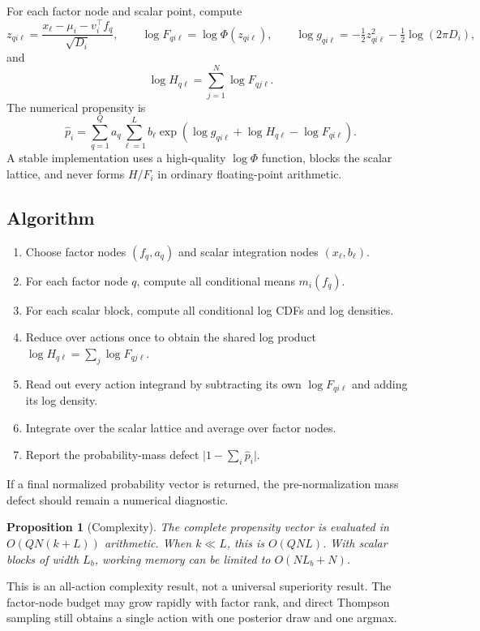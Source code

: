 \documentclass[11pt]{article}
\newtheorem{proposition}[theorem]{Proposition}
\begin{document}
For each factor node and scalar point, compute
\[
z_{qi\ell} = \frac{x_\ell - \mu_i - v_i^\top f_q}{\sqrt{D_i}},
\qquad
\log F_{qi\ell} = \log \Phi(z_{qi\ell}),
\qquad
\log g_{qi\ell} = -\tfrac12 z_{qi\ell}^2 - \tfrac12 \log(2\pi D_i),
\]
and
\[
\log H_{q\ell} = \sum_{j=1}^N \log F_{qj\ell}.
\]
The numerical propensity is
\[
\widehat p_i
=
\sum_{q=1}^Q a_q
\sum_{\ell=1}^L b_\ell
\exp\!\left(
\log g_{qi\ell} + \log H_{q\ell} - \log F_{qi\ell}
\right).
\]
A stable implementation uses a high-quality $\log \Phi$ function, blocks the scalar lattice, and never forms $H / F_i$ in ordinary floating-point arithmetic.

\subsection{Algorithm}

\begin{enumerate}
\item Choose factor nodes $(f_q, a_q)$ and scalar integration nodes $(x_\ell, b_\ell)$.
\item For each factor node $q$, compute all conditional means $m_i(f_q)$.
\item For each scalar block, compute all conditional log CDFs and log densities.
\item Reduce over actions once to obtain the shared log product $\log H_{q\ell} = \sum_j \log F_{qj\ell}$.
\item Read out every action integrand by subtracting its own $\log F_{qi\ell}$ and adding its log density.
\item Integrate over the scalar lattice and average over factor nodes.
\item Report the probability-mass defect $\bigl| 1 - \sum_i \widehat p_i \bigr|$.
\end{enumerate}

If a final normalized probability vector is returned, the pre-normalization mass defect should remain a numerical diagnostic.

\begin{proposition}[Complexity]
\label{prop:complexity}
The complete propensity vector is evaluated in $O(QN(k+L))$ arithmetic. When $k \ll L$, this is $O(QNL)$. With scalar blocks of width $L_b$, working memory can be limited to $O(N L_b + N)$.
\end{proposition}

This is an all-action complexity result, not a universal superiority result. The factor-node budget may grow rapidly with factor rank, and direct Thompson sampling still obtains a single action with one posterior draw and one argmax.
\end{document}
